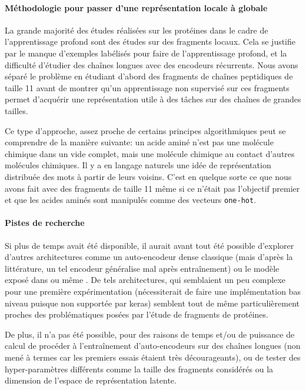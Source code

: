 \documentclass[a4paper, 11pt, onecolumn]{article}
\begin{document}
\paragraph{Méthodologie pour passer d'une représentation locale à globale}

La grande majorité des études réalisées sur les protéines dans le cadre de
l'apprentissage profond sont des études sur des fragments locaux. Cela se
justifie par le manque d'exemples labélisés pour faire de l'apprentissage
profond, et la difficulté d'étudier des chaînes longues avec des encodeurs
récurrents. Nous avons séparé le problème en étudiant d'abord des fragments de
chaînes peptidiques de taille 11 avant de montrer qu'un apprentissage non
supervisé sur ces fragments permet d'acquérir une représentation utile à des
tâches sur des chaînes de grandes tailles.

Ce type d'approche, assez proche de certains principes algorithmiques peut se
comprendre de la manière suivante: un acide aminé n'est pas une molécule
chimique dans un vide complet, mais une molécule chimique au contact d'autres
molécules chimiques. Il y a en langage naturels une idée de représentation
distribuée des mots à partir de leurs voisins. C'est en quelque sorte ce que
nous avons fait avec des fragments de taille 11 même si ce n'était pas
l'objectif premier et que les acides aminés sont manipulés comme des vecteurs
\texttt{one-hot}. 

\paragraph{Pistes de recherche}

Si plus de temps avait été disponible, il aurait avant tout été possible
d'explorer d'autres architectures comme un auto-encodeur dense classique (mais
d'après la littérature, un tel encodeur généralise mal après entraînement) ou
le modèle exposé dans \cite{DBLP:journals/corr/ChoMGBSB14} ou même
\cite{bahdanau2014neural}. De tels architectures, qui semblaient un peu complexe
pour une première expérimentation (nécessiterait de faire une implémentation bas
niveau puisque non supportée par keras) semblent tout de même particulièrement
proches des problématiques posées par l'étude de fragments de protéines.

De plus, il n'a pas été possible, pour des raisons de temps et/ou de puissance
de calcul de procéder à l'entraînement d'auto-encodeurs sur des chaînes longues
(non mené à termes car les premiers essais étaient très décourageants),
ou de tester des hyper-paramètres différents comme la taille des fragments
considérés ou la dimension de l'espace de représentation latente.
\end{document}
